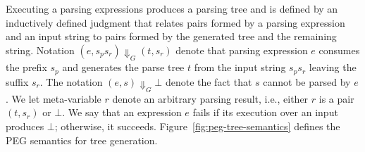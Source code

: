 Executing a parsing expressions produces a parsing tree and is defined by an
inductively defined judgment that relates pairs formed by a parsing expression
and an input string to pairs formed by the generated tree and the remaining string.
Notation \((e,s_ps_r) \Downarrow_G (t,s_r)\) denote that parsing expression \(e\)
consumes the prefix \(s_p\) and generates the parse tree \(t\) from the input string
\(s_ps_r\) leaving the suffix \(s_r\). The notation \((e,s) \Downarrow_G \bot\)
denote the fact that \(s\) cannot be parsed by \(e\). We let meta-variable \(r\)
denote an arbitrary parsing result, i.e., either \(r\) is a pair \((t,s_r)\) or
\(\bot\). We say that an expression \(e\) fails if its execution over an input
produces \(\bot\); otherwise, it succeeds. Figure~\ref{fig:peg-tree-semantics}
defines the PEG semantics for tree generation.

